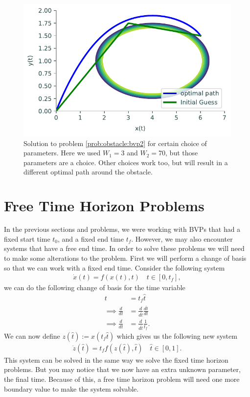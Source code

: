 \begin{figure}[H]
    \centering
    \includegraphics[width=\textwidth]{figures/OA_prob2.pdf}
    \caption{Solution to problem \ref{prob:obstacle:bvp2} for certain choice of parameters.  Here we used $W_1=3$ and $W_2=70$, but those parameters are a choice.  Other choices work too, but will result in a different optimal path around the obstacle.}
    \label{fig:OA_prob2}
\end{figure}

\section*{Free Time Horizon Problems}
In the previous sections and problems, we were working with BVPs that had a fixed start time $t_0$, and a fixed end time $t_f$.
However, we may also encounter systems that have a free end time.
In order to solve these problems we will need to make some alterations to the problem.
First we will perform a change of basis so that we can work with a fixed end time.
Consider the following system
\begin{align*}
    \dot{x}(t) = f(x(t),t)\quad t\in[0,t_f],
\end{align*}
we can do the following change of basis for the time variable
\begin{align*}
    t &= t_f\hat{t} \\
    \implies \frac{d}{dt} &= \frac{d}{d\hat{t}}\frac{d\hat{t}}{dt} \\
    \implies \frac{d}{dt} &= \frac{d}{d\hat{t}}\frac{1}{t_f}.
\end{align*}
We can now define $z(\hat{t}):=x(t_f\hat{t})$ which gives us the following new system
\begin{align*}
    \dot{z}\left(\hat{t}\right) = t_ff\left(z\left(\hat{t}\right),\hat{t}\right)\quad \hat{t}\in[0,1].
\end{align*}
This system can be solved in the same way we solve the fixed time horizon problems.
But you may notice that we now have an extra unknown parameter, the final time.
Because of this, a free time horizon problem will need one more boundary value to make the system solvable.

